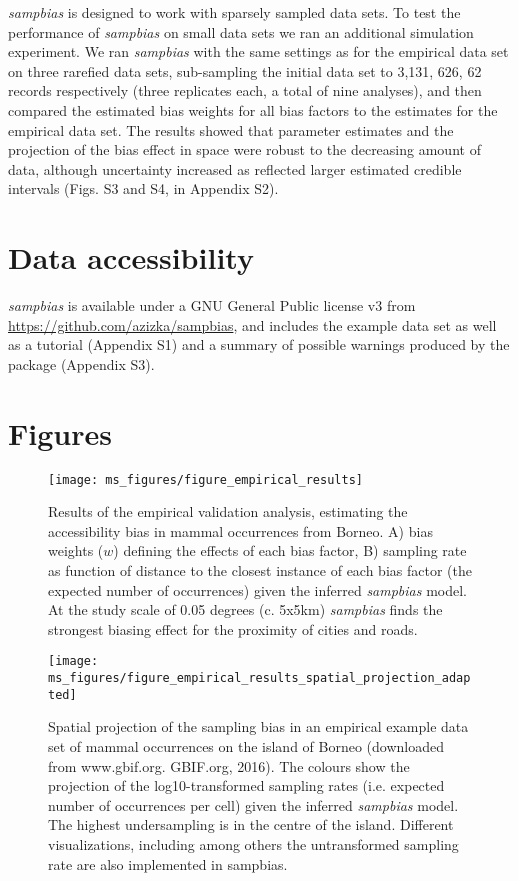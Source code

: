 \documentclass[
  12pt,
]{article}
\begin{document}
\emph{sampbias} is designed to work with sparsely sampled data sets. To test the performance of \emph{sampbias} on small data sets we ran an additional simulation experiment. We ran \emph{sampbias} with the same settings as for the empirical data set on three rarefied data sets, sub-sampling the initial data set to 3,131, 626, 62 records respectively (three replicates each, a total of nine analyses), and then compared the estimated bias weights for all bias factors to the estimates for the empirical data set. The results showed that parameter estimates and the projection of the bias effect in space were robust to the decreasing amount of data, although uncertainty increased as reflected larger estimated credible intervals (Figs. S3 and S4, in Appendix S2).

\hypertarget{data-accessibility}{%
\section{Data accessibility}\label{data-accessibility}}

\emph{sampbias} is available under a GNU General Public license v3 from \url{https://github.com/azizka/sampbias}, and includes the example data set as well as a tutorial (Appendix S1) and a summary of possible warnings produced by the package (Appendix S3).

\hypertarget{figures}{%
\section{Figures}\label{figures}}

\begin{figure}
\texttt{[image: ms\_figures/figure\_empirical\_results]} \caption{Results of the empirical validation analysis, estimating the accessibility bias in mammal occurrences from Borneo. A) bias weights ($w$) defining the effects of each bias factor, B) sampling rate as function of distance to the closest instance of each bias factor (the expected number of occurrences) given the inferred \textit{sampbias} model. At the study scale of 0.05 degrees (c. 5x5km) \textit{sampbias} finds the strongest biasing effect for the proximity of cities and roads.}\label{fig:empirical}
\end{figure}

\begin{figure}
\texttt{[image: ms\_figures/figure\_empirical\_results\_spatial\_projection\_adapted]} \caption{Spatial projection of the sampling bias in an empirical example data set of mammal occurrences on the island of Borneo (downloaded from www.gbif.org. GBIF.org, 2016). The colours show the projection of the log10-transformed sampling rates (i.e. expected number of occurrences per cell) given the inferred \textit{sampbias} model. The highest undersampling is in the centre of the island. Different visualizations, including among others the untransformed sampling rate are also implemented in sampbias.}\label{fig:spatial}
\end{figure}
\end{document}
